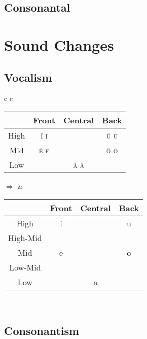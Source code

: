 \documentclass{report}
\begin{document}
\subsection{Consonantal}

\begin{tcolorbox}[title=Proto-Romance Consonants]
  
\end{tcolorbox}

\section{Sound Changes}

\subsection{Vocalism}

\begin{tabular}{c c}
  \begin{tabular}{|c|c|c|c|}
    \hline
    & Front & Central & Back \\
    \hline
    High & \textsc{\u{i} \={i}} & & \textsc{\u{u} \={u}} \\
    \hline
    Mid & \textsc{\u{e} \={e}} & & \textsc{\u{o} \={o}} \\
    \hline
    Low & & \textsc{\u{a} \={a}} & \\
    \hline
  \end{tabular}
  \quad $\Rightarrow$ & 
  \begin{tabular}{|c|c|c|c|}
    \hline
    & Front & Central & Back \\
    \hline
    High & i & & u \\
    \hline
    High-Mid & \cellcolor{gray} \textipa{I} & & \cellcolor{gray} \textipa{U} \\
    \hline
    Mid & e & & o \\
    \hline
    Low-Mid & \textipa{E} & & \textipa{O} \\
    \hline
    Low & & a & \\
    \hline
  \end{tabular}
  \vspace{0.3cm} \\
\end{tabular}

\subsection{Consonantism}
\end{document}
